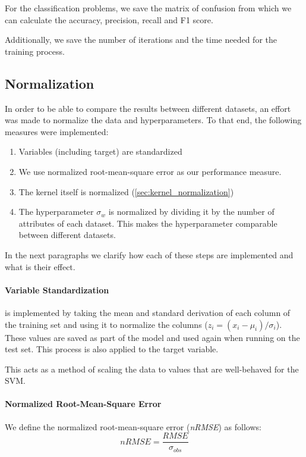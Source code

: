 For the classification problems, we save the matrix of confusion from which we
can calculate the accuracy, precision, recall and F1 score.

Additionally, we save the number of iterations and the time needed for the
training process.

\subsection{Normalization}

In order to be able to compare the results between different datasets, an effort
was made to normalize the data and hyperparameters. To that end, the following
measures were implemented:

\begin{enumerate}
    \item Variables (including target) are standardized
    \item We use normalized root-mean-square error as our performance
          measure.
    \item The kernel itself is normalized (\cref{sec:kernel_normalization})
    \item The hyperparameter $\sigma_w$ is normalized by dividing it by the
          number of attributes of each dataset. This makes the hyperparameter
          comparable between different datasets.
\end{enumerate}

In the next paragraphs we clarify how each of these steps are implemented and
what is their effect.

\paragraph{Variable Standardization} is implemented by taking the mean and
standard derivation of each column of the training set and using it to normalize
the columns ($z_i = (x_i - \mu_i)/\sigma_i$). These values are saved as part of
the model and used again when running on the test set. This process is also
applied to the target variable.

This acts as a method of scaling the data to values that are well-behaved for
the SVM.

\paragraph{Normalized Root-Mean-Square Error} We define the
normalized root-mean-square error (\emph{nRMSE}) as follows:
\begin{equation}
    nRMSE = \frac{RMSE}{\sigma_{obs}}
\end{equation}

